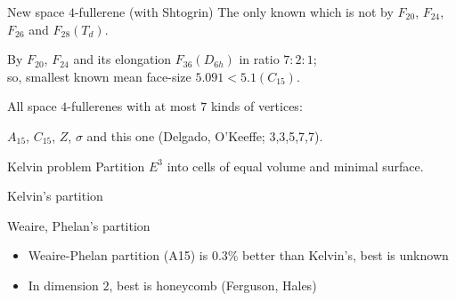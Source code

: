 \documentclass[%
pdf,
colorBG,
slideColor,
]{prosper}
\begin{document}
\begin{slide}{New space $4$-fullerene (with Shtogrin)}
\vspace{-3mm}
The only known which is not by
$F_{20}$, $F_{24}$, $F_{26}$ and $F_{28}(T_d)$. \par
By $F_{20}$, $F_{24}$ and its elongation $F_{36}(D_{6h})$
in ratio $7:2:1$; \\
so, smallest known mean face-size $5.091<5.1 (C_{15})$.

\begin{center}
\begin{minipage}[b]{5.5cm}
\centering
{}\par
\end{minipage}
\begin{minipage}[b]{5.5cm}
\centering
{}\par
\end{minipage}
\end{center}

All space $4$-fullerenes with at most $7$ kinds of vertices:\par
$A_{15}$, $C_{15}$, $Z$, $\sigma$ and this one
(Delgado, O'Keeffe; 3,3,5,7,7).

\end{slide}





\begin{slide}{Kelvin problem}
Partition $E^3$ into cells of equal volume and minimal surface.

\begin{center}
\begin{minipage}[b]{5.5cm}
\centering
{}\par
Kelvin's partition
\end{minipage}
\begin{minipage}[b]{5.5cm}
\centering
{}\par
Weaire, Phelan's partition
\end{minipage}
\end{center}
\begin{itemize}
\item Weaire-Phelan partition (A15) is 0.3\% better than Kelvin's, best is unknown 
\item In dimension $2$, best is honeycomb (Ferguson, Hales)
\end{itemize}


\end{slide}
\end{document}
